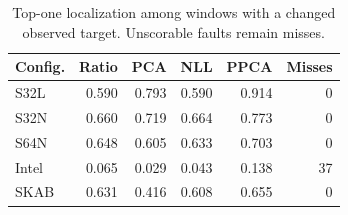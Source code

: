 \begin{table}[t]
\centering
\caption{Top-one localization among windows with a changed observed target. Unscorable faults remain misses.}
\label{tab:localization}
\small
\begin{tabular}{lrrrrr}
\toprule
Config. & Ratio & PCA & NLL & PPCA & Misses \\
\midrule
S32L & 0.590 & 0.793 & 0.590 & 0.914 & 0 \\
S32N & 0.660 & 0.719 & 0.664 & 0.773 & 0 \\
S64N & 0.648 & 0.605 & 0.633 & 0.703 & 0 \\
Intel & 0.065 & 0.029 & 0.043 & 0.138 & 37 \\
SKAB & 0.631 & 0.416 & 0.608 & 0.655 & 0 \\
\bottomrule
\end{tabular}
\end{table}
